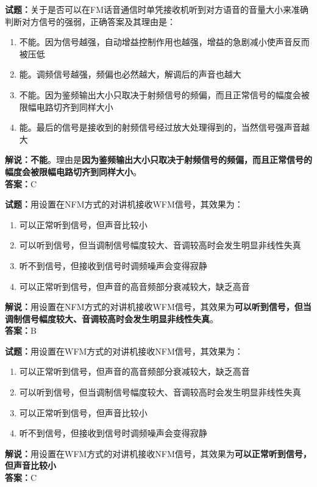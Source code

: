 \documentclass{ctexbook}
\begin{document}
\vspace{1em}

\textbf{试题：}关于是否可以在FM话音通信时单凭接收机听到对方语音的音量大小来准确判断对方信号的强弱，正确答案及其理由是：
\begin{enumerate}[leftmargin=3em]
  \item 不能。因为信号越强，自动增益控制作用也越强，增益的急剧减小使声音反而被压低
  \item 能。调频信号越强，频偏也必然越大，解调后的声音也越大
  \item 不能。因为鉴频输出大小只取决于射频信号的频偏，而且正常信号的幅度会被限幅电路切齐到同样大小
  \item 能。最后的信号是接收到的射频信号经过放大处理得到的，当然信号强声音越大
\end{enumerate}
\noindent\textbf{解说：}\textbf{不能}。理由是\textbf{因为鉴频输出大小只取决于射频信号的频偏，而且正常信号的幅度会被限幅电路切齐到同样大小}。\\\noindent\textbf{答案：}C

\vspace{1em}

\textbf{试题：}用设置在NFM方式的对讲机接收WFM信号，其效果为：
\begin{enumerate}[leftmargin=3em]
  \item 可以正常听到信号，但声音比较小
  \item 可以听到信号，但当调制信号幅度较大、音调较高时会发生明显非线性失真
  \item 听不到信号，但接收到信号时调频噪声会变得寂静
  \item 可以正常听到信号，但声音的高音频部分衰减较大，缺乏高音
\end{enumerate}
\noindent\textbf{解说：}用设置在NFM方式的对讲机接收WFM信号，其效果为\textbf{可以听到信号，但当调制信号幅度较大、音调较高时会发生明显非线性失真}。\\\noindent\textbf{答案：}B

\vspace{1em}

\textbf{试题：}用设置在WFM方式的对讲机接收NFM信号，其效果为：
\begin{enumerate}[leftmargin=3em]
  \item 可以正常听到信号，但声音的高音频部分衰减较大，缺乏高音
  \item 可以听到信号，但当调制信号幅度较大、音调较高时会发生明显非线性失真
  \item 可以正常听到信号，但声音比较小
  \item 听不到信号，但接收到信号时调频噪声会变得寂静
\end{enumerate}
\noindent\textbf{解说：}用设置在WFM方式的对讲机接收NFM信号，其效果为\textbf{可以正常听到信号，但声音比较小}\\\noindent\textbf{答案：}C
\end{document}
